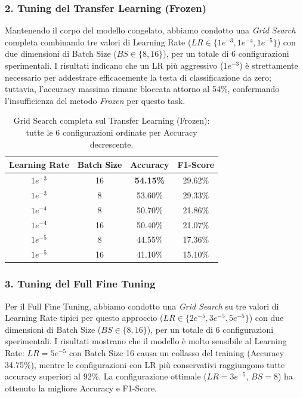 \documentclass[a4paper,12pt]{article}
\begin{document}
\subsubsection{2. Tuning del Transfer Learning (Frozen)}
Mantenendo il corpo del modello congelato, abbiamo condotto una \textit{Grid Search} completa combinando tre valori di Learning Rate ($LR \in \{1e^{-3}, 1e^{-4}, 1e^{-5}\}$) con due dimensioni di Batch Size ($BS \in \{8, 16\}$), per un totale di 6 configurazioni sperimentali.
I risultati indicano che un LR più aggressivo ($1e^{-3}$) è strettamente necessario per addestrare efficacemente la testa di classificazione da zero; tuttavia, l'accuracy massima rimane bloccata attorno al 54\%, confermando l'insufficienza del metodo \textit{Frozen} per questo task.

\begin{table}[H]
    \centering
    \begin{tabular}{|c|c|c|c|}
        \hline
        \textbf{Learning Rate} & \textbf{Batch Size} & \textbf{Accuracy} & \textbf{F1-Score} \\
        \hline
        $1e^{-3}$              & 16                  & \textbf{54.15\%}  & 29.62\%           \\
        $1e^{-3}$              & 8                   & 53.60\%           & 29.33\%           \\
        $1e^{-4}$              & 8                   & 50.70\%           & 21.86\%           \\
        $1e^{-4}$              & 16                  & 50.40\%           & 21.07\%           \\
        $1e^{-5}$              & 8                   & 44.55\%           & 17.36\%           \\
        $1e^{-5}$              & 16                  & 41.10\%           & 15.10\%           \\
        \hline
    \end{tabular}
    \caption{Grid Search completa sul Transfer Learning (Frozen): tutte le 6 configurazioni ordinate per Accuracy decrescente.}
\end{table}

\subsubsection{3. Tuning del Full Fine Tuning}
Per il Full Fine Tuning, abbiamo condotto una \textit{Grid Search} su tre valori di Learning Rate tipici per questo approccio
($LR \in \{2e^{-5}, 3e^{-5}, 5e^{-5}\}$) con due dimensioni di Batch Size ($BS \in \{8, 16\}$), per un totale di 6 configurazioni sperimentali.
I risultati mostrano che il modello è molto sensibile al Learning Rate: $LR = 5e^{-5}$ con Batch Size 16 causa un collasso del training
(Accuracy 34.75\%), mentre le configurazioni con LR più conservativi raggiungono tutte accuracy superiori al 92\%. La configurazione
ottimale ($LR = 3e^{-5}$, $BS = 8$) ha ottenuto la migliore Accuracy e F1-Score.
\end{document}
